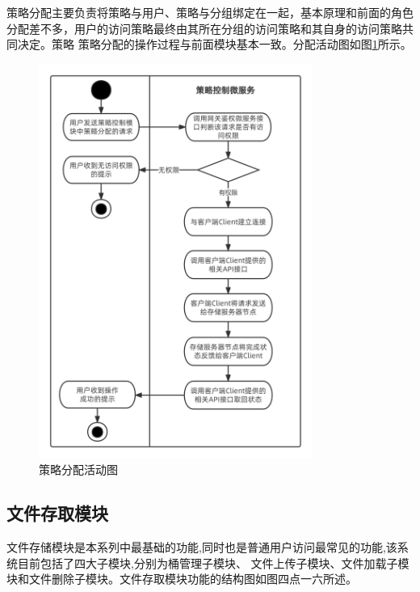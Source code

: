 策略分配主要负责将策略与用户、策略与分组绑定在一起，基本原理和前面的角色分配差不多，用户的访问策略最终由其所在分组的访问策略和其自身的访问策略共同决定。策略
策略分配的操作过程与前面模块基本一致。分配活动图如图\ref{fig:策略分配活动图}所示。

\begin{figure}[htb]
    \centering
    \includegraphics[width=0.8\textwidth]{my_figures/chapter4/策略分配活动图.png}
    \caption{策略分配活动图}
    \label{fig:策略分配活动图}
\end{figure}

\subsection{文件存取模块}


文件存储模块是本系列中最基础的功能,同时也是普通用户访问最常见的功能,该系统目前包括了四大子模块,分别为桶管理子模块、
文件上传子模块、文件加载子模块和文件删除子模块。文件存取模块功能的结构图如图四点一六所述。

